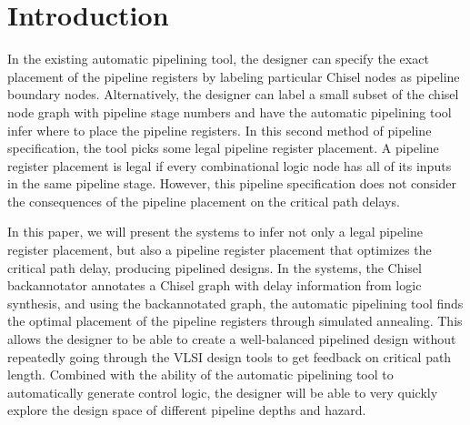 \section{Introduction}
In the existing automatic pipelining tool, the designer can specify the exact placement of the pipeline registers by labeling particular Chisel nodes as pipeline boundary nodes. Alternatively, the designer can label a small subset of the chisel node graph with pipeline stage numbers and have the automatic pipelining tool infer where to place the pipeline registers. In this second method of pipeline specification, the tool picks some legal pipeline register placement. A pipeline register placement is legal if every combinational logic node has all of its inputs in the same pipeline stage. However, this pipeline specification does not consider the consequences of the pipeline placement on the critical path delays.

In this paper, we will present the systems to infer not only a legal pipeline register placement, but also a pipeline register placement that optimizes the critical path delay, producing pipelined designs. In the systems, the Chisel backannotator annotates a Chisel graph with delay information from logic synthesis, and using the backannotated graph, the automatic pipelining tool finds the optimal placement of the pipeline registers through simulated annealing. This allows the designer to be able to create a well-balanced pipelined design without repeatedly going through the VLSI design tools to get feedback on critical path length. Combined with the ability of the automatic pipelining tool to automatically generate control logic, the designer will be able to very quickly explore the design space of different pipeline depths and hazard. 

